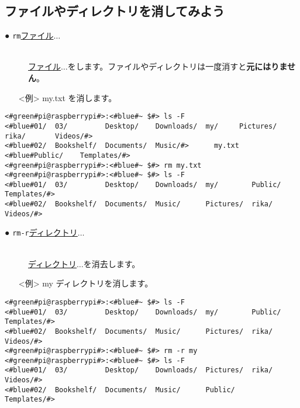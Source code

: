 \subsection{ファイルやディレクトリを消してみよう}
\begin{description}
\item[● \texttt{rm}\textvisiblespace \underline{ファイル}$\ldots$]\mbox{}\\
\underline{ファイル}$\ldots$をします。ファイルやディレクトリは一度消すと\textbf{元にはりません}。
\end{description}
\begin{itemize}
\item[<例>]my.txt を消します。
\end{itemize}
\begin{lstlisting}[caption=rmの例, label=rm]
<#green#pi@raspberrypi#>:<#blue#~ $#> ls -F
<#blue#01/  03/         Desktop/    Downloads/  my/     Pictures/  rika/       Videos/#>
<#blue#02/  Bookshelf/  Documents/  Music/#>      my.txt  <#blue#Public/    Templates/#>
<#green#pi@raspberrypi#>:<#blue#~ $#> rm my.txt
<#green#pi@raspberrypi#>:<#blue#~ $#> ls -F
<#blue#01/  03/         Desktop/    Downloads/  my/        Public/  Templates/#>
<#blue#02/  Bookshelf/  Documents/  Music/      Pictures/  rika/    Videos/#>
\end{lstlisting}
\begin{description}
\item[● \texttt{rm}\textvisiblespace \texttt{-r}\textvisiblespace \underline{ディレクトリ}$\ldots$]\mbox{}\\
\underline{ディレクトリ}$\ldots$を消去します。
\end{description}
\newpage
\begin{itemize}
\item[<例>]my ディレクトリを消します。
\end{itemize}
\begin{lstlisting}[caption=rm -rの例, label=rm-R]
<#green#pi@raspberrypi#>:<#blue#~ $#> ls -F
<#blue#01/  03/         Desktop/    Downloads/  my/        Public/  Templates/#>
<#blue#02/  Bookshelf/  Documents/  Music/      Pictures/  rika/    Videos/#>
<#green#pi@raspberrypi#>:<#blue#~ $#> rm -r my
<#green#pi@raspberrypi#>:<#blue#~ $#> ls -F
<#blue#01/  03/         Desktop/    Downloads/  Pictures/  rika/       Videos/#>
<#blue#02/  Bookshelf/  Documents/  Music/      Public/    Templates/#>
\end{lstlisting}

